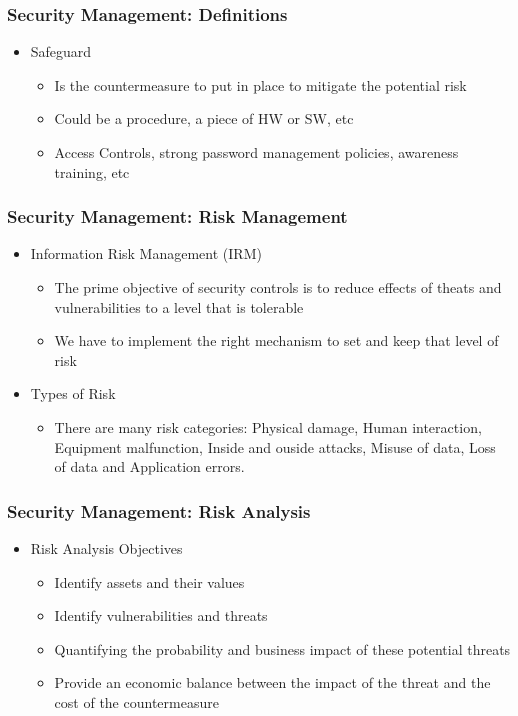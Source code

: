 \documentclass{beamer}
\begin{document}

\begin{frame}
\frametitle{Security Management: Definitions}
\begin{itemize}

\item Safeguard
  \begin{itemize}
  \item Is the countermeasure to put in place to mitigate the potential risk
  \item Could be a procedure, a piece of HW or SW, etc
  \item Access Controls, strong password management policies, awareness training, etc
  \end{itemize}
\end{itemize}
\end{frame}


\begin{frame}
\frametitle{Security Management: Risk Management}
\begin{itemize}

\item Information Risk Management (IRM)
  \begin{itemize}
  \item The prime objective of security controls is to reduce effects of theats and vulnerabilities to a level that is tolerable
  \item We have to implement the right mechanism to set and keep that level of risk
  \end{itemize}
\item Types of Risk
  \begin{itemize}
  \item There are many risk categories: Physical damage, Human interaction, Equipment malfunction, Inside and ouside attacks, Misuse of data, Loss of data and Application errors.
  \end{itemize}
\end{itemize}
\end{frame}


\begin{frame}
\frametitle{Security Management: Risk Analysis}
\begin{itemize}

\item Risk Analysis Objectives
  \begin{itemize}
  \item Identify assets and their values
  \item Identify vulnerabilities and threats 
  \item Quantifying the probability and business impact of these potential threats
  \item Provide an economic balance between the impact of the threat and the cost of the countermeasure 
  \end{itemize}
\end{itemize}
\end{frame}
\end{document}
